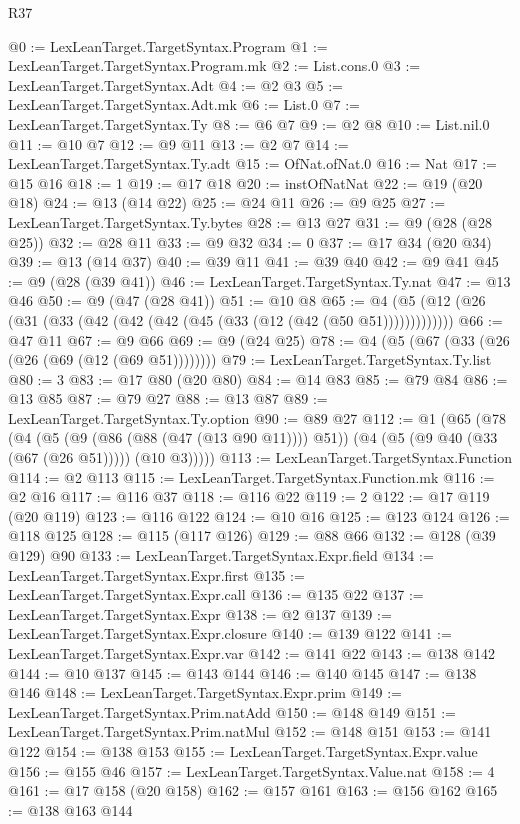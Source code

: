 \begin{lexlean}{R37}
\begin{coremodule}
@0 := LexLeanTarget.TargetSyntax.Program
@1 := LexLeanTarget.TargetSyntax.Program.mk
@2 := List.cons.{0}
@3 := LexLeanTarget.TargetSyntax.Adt
@4 := @2 @3
@5 := LexLeanTarget.TargetSyntax.Adt.mk
@6 := List.{0}
@7 := LexLeanTarget.TargetSyntax.Ty
@8 := @6 @7
@9 := @2 @8
@10 := List.nil.{0}
@11 := @10 @7
@12 := @9 @11
@13 := @2 @7
@14 := LexLeanTarget.TargetSyntax.Ty.adt
@15 := OfNat.ofNat.{0}
@16 := Nat
@17 := @15 @16
@18 := 1
@19 := @17 @18
@20 := instOfNatNat
@22 := @19 (@20 @18)
@24 := @13 (@14 @22)
@25 := @24 @11
@26 := @9 @25
@27 := LexLeanTarget.TargetSyntax.Ty.bytes
@28 := @13 @27
@31 := @9 (@28 (@28 @25))
@32 := @28 @11
@33 := @9 @32
@34 := 0
@37 := @17 @34 (@20 @34)
@39 := @13 (@14 @37)
@40 := @39 @11
@41 := @39 @40
@42 := @9 @41
@45 := @9 (@28 (@39 @41))
@46 := LexLeanTarget.TargetSyntax.Ty.nat
@47 := @13 @46
@50 := @9 (@47 (@28 @41))
@51 := @10 @8
@65 := @4 (@5 (@12 (@26 (@31 (@33 (@42 (@42 (@42 (@45 (@33 (@12 (@42 (@50 @51)))))))))))))
@66 := @47 @11
@67 := @9 @66
@69 := @9 (@24 @25)
@78 := @4 (@5 (@67 (@33 (@26 (@26 (@69 (@12 (@69 @51))))))))
@79 := LexLeanTarget.TargetSyntax.Ty.list
@80 := 3
@83 := @17 @80 (@20 @80)
@84 := @14 @83
@85 := @79 @84
@86 := @13 @85
@87 := @79 @27
@88 := @13 @87
@89 := LexLeanTarget.TargetSyntax.Ty.option
@90 := @89 @27
@112 := @1
    (@65
      (@78
        (@4
          (@5 (@9 (@86 (@88 (@47 (@13 @90 @11)))) @51))
          (@4 (@5 (@9 @40 (@33 (@67 (@26 @51))))) (@10 @3)))))
@113 := LexLeanTarget.TargetSyntax.Function
@114 := @2 @113
@115 := LexLeanTarget.TargetSyntax.Function.mk
@116 := @2 @16
@117 := @116 @37
@118 := @116 @22
@119 := 2
@122 := @17 @119 (@20 @119)
@123 := @116 @122
@124 := @10 @16
@125 := @123 @124
@126 := @118 @125
@128 := @115 (@117 @126)
@129 := @88 @66
@132 := @128 (@39 @129) @90
@133 := LexLeanTarget.TargetSyntax.Expr.field
@134 := LexLeanTarget.TargetSyntax.Expr.first
@135 := LexLeanTarget.TargetSyntax.Expr.call
@136 := @135 @22
@137 := LexLeanTarget.TargetSyntax.Expr
@138 := @2 @137
@139 := LexLeanTarget.TargetSyntax.Expr.closure
@140 := @139 @122
@141 := LexLeanTarget.TargetSyntax.Expr.var
@142 := @141 @22
@143 := @138 @142
@144 := @10 @137
@145 := @143 @144
@146 := @140 @145
@147 := @138 @146
@148 := LexLeanTarget.TargetSyntax.Expr.prim
@149 := LexLeanTarget.TargetSyntax.Prim.natAdd
@150 := @148 @149
@151 := LexLeanTarget.TargetSyntax.Prim.natMul
@152 := @148 @151
@153 := @141 @122
@154 := @138 @153
@155 := LexLeanTarget.TargetSyntax.Expr.value
@156 := @155 @46
@157 := LexLeanTarget.TargetSyntax.Value.nat
@158 := 4
@161 := @17 @158 (@20 @158)
@162 := @157 @161
@163 := @156 @162
@165 := @138 @163 @144

\end{coremodule}
\end{lexlean}
